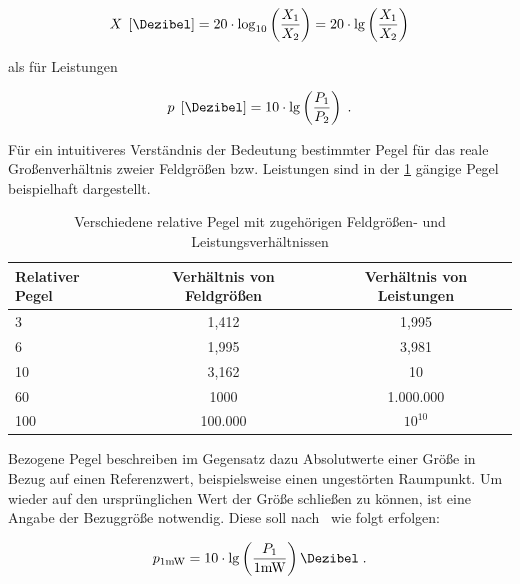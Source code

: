 \begin{equation}
    X \; \left[\si{\Dezibel}\right] = 20 \cdot \log_{10} \left( \frac{X_1}{X_2} \right) = 20 \cdot \lg \left( \frac{X_1}{X_2} \right) \label{eq:2_Relativer_Pegel_Feldgroessen}
\end{equation}

als für Leistungen

\begin{equation}
    p \; \left[\si{\Dezibel}\right] = 10 \cdot \lg \left( \frac{P_1}{P_2} \right) \; \text{.} \label{eq:2_Relativer_Pegel_Leistung}
\end{equation}

Für ein intuitiveres Verständnis der Bedeutung bestimmter Pegel für das reale Großenverhältnis zweier Feldgrößen bzw. Leistungen sind in der \Tabelle\ref{tab:2_Relative_Pegel} gängige Pegel beispielhaft dargestellt.
\par
\vspace{\linespace}

\begin{table}[H]
\renewcommand{\arraystretch}{\tablestretch}
\centering
\caption{Verschiedene relative Pegel mit zugehörigen Feldgrößen- und Leistungsverhältnissen}
\vspace{\tablespace}
\begin{tabular}{l c c}
    \toprule
    \textbf{Relativer Pegel} \boldmath{$\left[\si{\Dezibel}\right]$} & \textbf{Verhältnis von Feldgrößen} & \textbf{Verhältnis von Leistungen} \\
    \midrule
    3   &   1,412   &   1,995   \\
    6   &   1,995   &   3,981   \\
    10  &   3,162   &   10      \\
    60  &   1000    &   1.000.000 \\
    100 &   100.000  &   $10^{10}$ \\
    \bottomrule
\end{tabular}
\label{tab:2_Relative_Pegel}
\end{table}

Bezogene Pegel beschreiben im Gegensatz dazu Absolutwerte einer Größe in Bezug auf einen Referenzwert, beispielsweise einen ungestörten Raumpunkt. Um wieder auf den ursprünglichen Wert der Größe schließen zu können, ist eine Angabe der Bezuggröße notwendig. Diese soll nach~\cite{IEC60027-3} wie folgt erfolgen: 

\begin{equation}
    p_{1 \si{\milli\watt}} = 10 \cdot \lg \left( \frac{P_1}{1 \si{\milli\watt}}\right) \si{\Dezibel} \; .
\end{equation}

